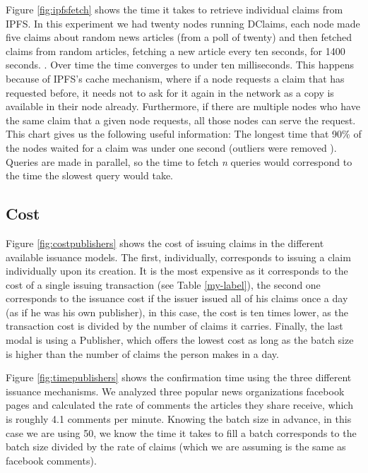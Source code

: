 Figure \ref{fig:ipfsfetch} shows the time it takes to retrieve individual claims from IPFS. In this experiment we had twenty nodes running DClaims, each node made five claims about random news articles (from a poll of twenty) and then fetched claims from random articles, fetching a new article every ten seconds, for 1400 seconds. . Over time the time converges to under ten milliseconds. This happens because of IPFS's cache mechanism, where if a node requests a claim that has requested before, it needs not to ask for it again in the network as a copy is available in their node already. Furthermore, if there are multiple nodes who have the same claim that a given node requests, all those nodes can serve the request.
This chart gives us the following useful information: The longest time that 90\% of the nodes waited for a claim was under one second (outliers were removed ).
Queries are made in parallel, so the time to fetch \textit{n} queries would correspond to the time the slowest query would take.



\subsection{Cost}
Figure \ref{fig:costpublishers} shows the cost of issuing claims in the different available issuance models. The first, individually, corresponds to issuing a claim individually upon its creation. It is the most expensive as it corresponds to the cost of a single issuing transaction (see Table \ref{my-label}), the second one corresponds to the issuance cost if the issuer issued all of his claims once a day (as if he was his own publisher), in this case, the cost is ten times lower, as the transaction cost is divided by the number of claims it carries. Finally, the last modal is using a Publisher, which offers the lowest cost as long as the batch size is higher than the number of claims the person makes in a day.

Figure \ref{fig:timepublishers} shows the confirmation time using the three different issuance mechanisms.
We analyzed three popular news organizations facebook pages and calculated the rate of comments the articles they share receive, which is roughly 4.1 comments per minute. Knowing the batch size in advance, in this case we are using 50, we know the time it takes to fill a batch corresponds to the batch size divided by the rate of claims (which we are assuming is the same as facebook comments).

